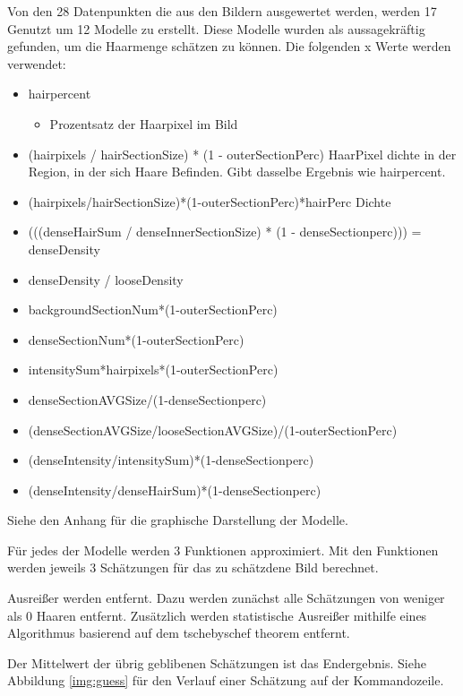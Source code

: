 \documentclass[german,a4paper,12pt]{llncs}
\begin{document}
Von den 28 Datenpunkten die aus den Bildern ausgewertet werden, werden 17 Genutzt um 12 Modelle zu erstellt. Diese Modelle wurden als aussagekräftig gefunden, um die Haarmenge schätzen zu können. Die folgenden x Werte werden verwendet:

\begin{itemize}
	\item hairpercent 
	\begin{itemize}
		\item Prozentsatz der Haarpixel im Bild
	\end{itemize}
	\item (hairpixels / hairSectionSize) * (1 - outerSectionPerc)
	HaarPixel dichte in der Region, in der sich Haare Befinden. Gibt dasselbe Ergebnis wie hairpercent.
	\item (hairpixels/hairSectionSize)*(1-outerSectionPerc)*hairPerc
	Dichte 
	
	\item (((denseHairSum / denseInnerSectionSize) * (1 - denseSectionperc))) = denseDensity
	\item denseDensity / looseDensity
	\item backgroundSectionNum*(1-outerSectionPerc)
	\item denseSectionNum*(1-outerSectionPerc)
	\item intensitySum*hairpixels*(1-outerSectionPerc)
	\item denseSectionAVGSize/(1-denseSectionperc)
	\item (denseSectionAVGSize/looseSectionAVGSize)/(1-outerSectionPerc)
	\item (denseIntensity/intensitySum)*(1-denseSectionperc)
	\item (denseIntensity/denseHairSum)*(1-denseSectionperc)
\end{itemize}

Siehe den Anhang für die graphische Darstellung der Modelle.

Für jedes der Modelle werden 3 Funktionen approximiert. Mit den Funktionen werden jeweils 3 Schätzungen für das zu schätzdene Bild berechnet. 

Ausreißer werden entfernt. Dazu werden zunächst alle Schätzungen von weniger als 0 Haaren entfernt. Zusätzlich werden statistische Ausreißer mithilfe eines Algorithmus basierend auf dem tschebyschef theorem entfernt. 

Der Mittelwert der übrig geblibenen Schätzungen ist das Endergebnis. 
Siehe Abbildung \ref{img:guess} für den Verlauf einer Schätzung auf der Kommandozeile.
\end{document}
